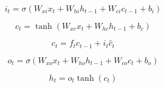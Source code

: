 \begin{equation} \label{eq:i_t}
	i_t = \sigma(W_{xi}x_t + W_{hi}h_{t-1} + W_{ci}c_{t-1} + b_i)
\end{equation}

\begin{equation} \label{eq:hatC_t}
	\hat{c}_t = \tanh(W_{xc}x_t + W_{hc}h_{t-1} + b_c)
\end{equation}

\begin{equation} \label{eq:C_t}
	c_t = f_t c_{t-1} + i_t \hat{c}_t
\end{equation}

\begin{equation} \label{eq:o_t}
	o_t = \sigma (W_{xo}x_t + W_{ho}h_{t-1} + W_{co}c_t + b_o)
\end{equation}

\begin{equation} \label{eq:h_t}
	h_t = o_t \tanh(c_t)
\end{equation}


\begin{comment}
\begin{equation} \label{eq:f_t}
	f_t = \sigma(W_f \cdot [h_{t-1},x_t] + b_f)
\end{equation}

\begin{equation} \label{eq:i_t}
i_t = \sigma(W_i \cdot [h_{t-1},x_t] + b_i)
\end{equation}

\begin{equation} \label{eq:hatC_t}
\hat{C}_t = \tanh(W_C \cdot [h_{t-1},x_t] + b_C)
\end{equation}

\begin{equation} \label{eq:C_t}
C_t = f_t \cdot C_{t-1} + i_t \cdot \hat{C}_t
\end{equation}

\begin{equation} \label{eq:o_t}
o_t = \sigma (W_o [h_{t-1}, x_t] + b_o)
\end{equation}

\begin{equation} \label{eq:h_t}
h_t = o_t \cdot \tanh(C_t)
\end{equation}
\end{comment}


